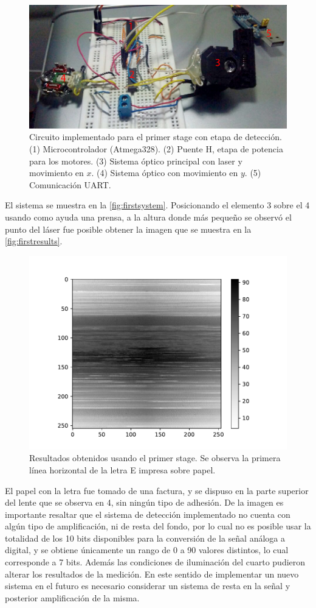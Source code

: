 \begin{figure}[h]
	\centering
	\includegraphics[width=0.8\linewidth]{figures/breadboard}
	\caption{Circuito implementado para el primer stage con etapa de detección. (1) Microcontrolador (Atmega328). (2) Puente H, etapa de potencia para los motores. (3) Sistema \'optico principal con laser y movimiento en $x$. (4) Sistema \'optico con movimiento en $y$. (5) Comunicaci\'on UART.}
	\label{fig:firstsystem}
\end{figure}

El sistema se muestra en la \autoref{fig:firstsystem}. Posicionando el elemento 3 sobre el 4 usando como ayuda una prensa, a la altura donde más pequeño se observó el punto del láser fue posible obtener la imagen que se muestra en la \autoref{fig:firstresults}.

\begin{figure}[h]
	\centering
	\includegraphics[width=0.62\linewidth]{figures/complete.pdf}
	\caption{Resultados obtenidos usando el primer stage. Se observa la primera línea horizontal de la letra E impresa sobre papel.}
	\label{fig:firstresults}
\end{figure}

El papel con la letra fue tomado de una factura, y se dispuso en la parte superior del lente que se observa en 4, sin ningún tipo de adhesión. De la imagen es importante resaltar que el sistema de detección implementado no cuenta con algún tipo de amplificación, ni de resta del fondo, por lo cual no es posible usar la totalidad de los 10 bits disponibles para la conversión de la señal análoga a digital, y se obtiene únicamente un rango de 0 a 90 valores distintos, lo cual corresponde a 7 bits. Además las condiciones de iluminación del cuarto pudieron alterar los resultados de la medición. En este sentido de implementar un nuevo sistema en el futuro es necesario considerar un sistema de resta en la señal y posterior amplificación de la misma.

